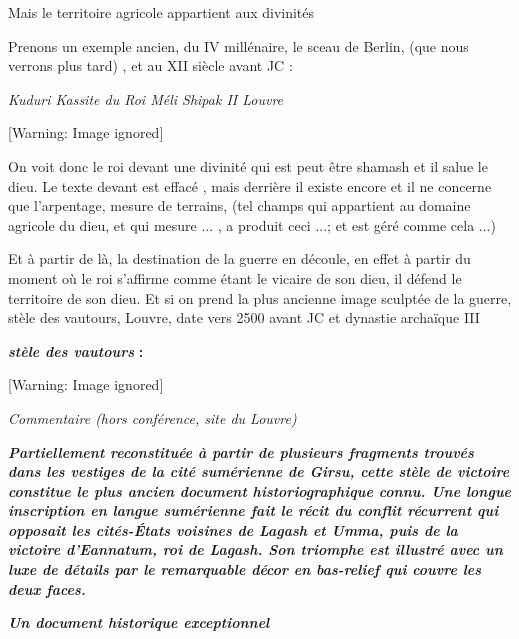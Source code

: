 \documentclass[a4paper,10pt]{article}
\begin{document}
\begin{itemize}
Mais le territoire agricole appartient aux divinités

Prenons un exemple ancien, du IV millénaire, le sceau de Berlin, (que
nous verrons plus tard) , et au XII siècle avant JC :

\textit{Kuduri Kassite du Roi Méli Shipak II  Louvre}

  [Warning: Image ignored] %
 

On voit donc le roi devant une divinité qui est peut être shamash et il
salue le dieu. Le texte devant est effacé , mais derrière il existe
encore et il ne concerne que l'arpentage, mesure de
terrains, (tel champs qui appartient au domaine agricole du dieu, et
qui mesure ... , a produit ceci ...; et est géré comme cela ...)

Et à partir de là, la destination de la guerre en découle,  en effet à
partir du moment où le roi s'affirme comme étant le
vicaire de son dieu, il défend le territoire de son dieu. Et si on
prend la plus ancienne image sculptée de la guerre, stèle des vautours,
Louvre, date vers 2500 avant JC et dynastie archaïque III

\textbf{\textit{stèle des vautours}}\textbf{ : }

  [Warning: Image ignored] %
 

\textit{Commentaire  (hors conférence, site du Louvre)}

\textbf{\textit{\textcolor[rgb]{0.101960786,0.101960786,0.101960786}{Partiellement
reconstituée à partir de plusieurs fragments trouvés dans les vestiges
de la cité sumérienne de Girsu, cette stèle de victoire constitue le
plus ancien document historiographique connu. Une longue inscription en
langue sumérienne fait le récit du conflit récurrent qui opposait les
cités-États voisines de Lagash et Umma, puis de la victoire
d'Eannatum, roi de Lagash. Son triomphe est illustré
avec un luxe de détails par le remarquable décor en bas-relief qui
couvre les deux faces.}}}

\textbf{\textit{Un document historique exceptionnel}}


\end{itemize}
\end{document}
